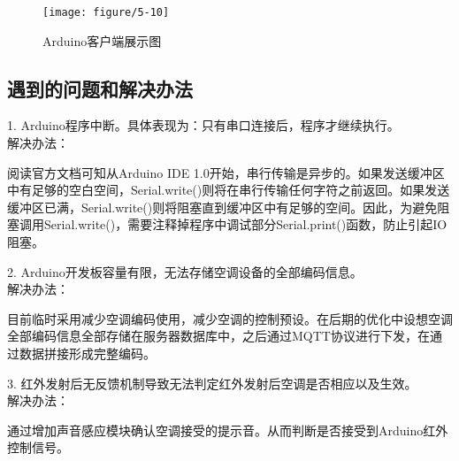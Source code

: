 \begin{figure}[htbp]
	\centering
	\texttt{[image: figure/5-10]}
	\caption{Arduino客户端展示图}
\end{figure}

\newpage
\subsection{遇到的问题和解决办法}
1. Arduino程序中断。具体表现为：只有串口连接后，程序才继续执行。
\\解决办法： 

阅读官方文档可知从Arduino IDE 1.0开始，串行传输是异步的。如果发送缓冲区中有足够的空白空间，Serial.write()则将在串行传输任何字符之前返回。如果发送缓冲区已满，Serial.write()则将阻塞直到缓冲区中有足够的空间。因此，为避免阻塞调用Serial.write()，需要注释掉程序中调试部分Serial.print()函数，防止引起IO阻塞。

2. Arduino开发板容量有限，无法存储空调设备的全部编码信息。
\\解决办法：

目前临时采用减少空调编码使用，减少空调的控制预设。在后期的优化中设想空调全部编码信息全部存储在服务器数据库中，之后通过MQTT协议进行下发，在通过数据拼接形成完整编码。

3. 红外发射后无反馈机制导致无法判定红外发射后空调是否相应以及生效。
\\解决办法：

通过增加声音感应模块确认空调接受的提示音。从而判断是否接受到Arduino红外控制信号。
